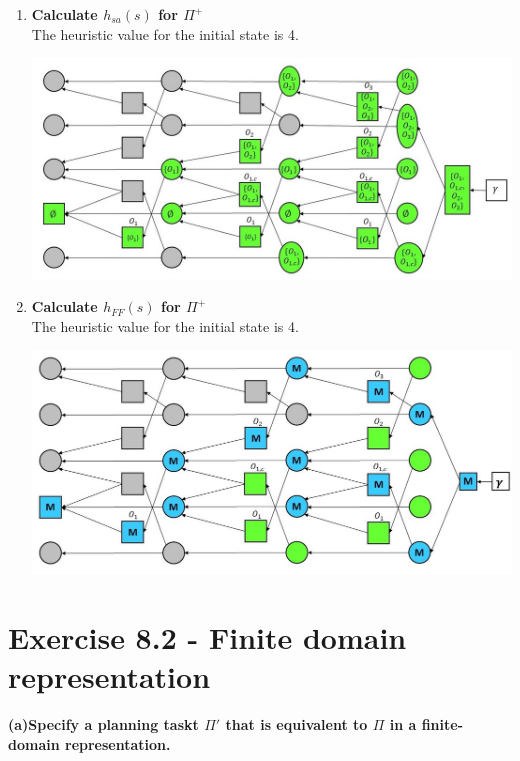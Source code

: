 \documentclass[12pt,a4paper]{article}
\begin{document}
\begin{enumerate}[label=(\alph*), listparindent=1.5em]
	\item \textbf{Calculate $h_{sa}(s)$ for $\Pi^+ $}\\
	The heuristic value for the initial state is 4.
	\begin{center}
		\includegraphics[scale=0.5]{hsa.jpg}\\
	\end{center}
	\item \textbf{Calculate $h_{FF}(s)$ for $\Pi^+ $}\\
	The heuristic value for the initial state is 4.
	\begin{center}
		\includegraphics[scale=0.5]{hff.jpg}\\
	\end{center}
\end{enumerate}

\section*{Exercise 8.2 - Finite domain representation}
\textbf{(a)Specify a planning taskt $\Pi'$ that is equivalent to $\Pi$
in a finite-domain representation.}\\
\end{document}

